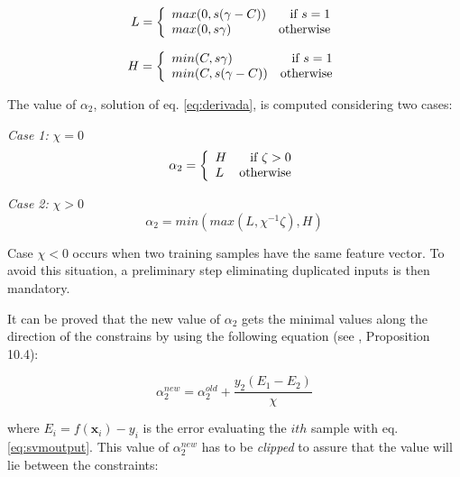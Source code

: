 \documentclass{ipol}
\def\x{{\mathbf x}}
\begin{document}
\begin{equation}
L = \left\{ \begin{array}{l r}
max(0,s(\gamma - C)) & \textrm{if }s = 1 \\
max(0,s\gamma) & \textrm{otherwise}
\end{array}
\right.
\end{equation}

\begin{equation}
H = \left\{ \begin{array}{l r}
min(C,s\gamma) & \textrm{if }s = 1 \\
min(C,s(\gamma-C)) & \textrm{otherwise}
\end{array}
\right.
\end{equation}

The value of $\alpha_2$, solution of eq. \ref{eq:derivada}, is computed considering two cases:

\noindent \textit{Case 1: }$\chi = 0$\\

\begin{equation}
\alpha_2 = \left\{ \begin{array}{l r}
H & \textrm{if }\zeta > 0 \\
L & \textrm{otherwise}
\end{array}
\right.
\end{equation}

\noindent \textit{Case 2: }$\chi > 0$\\

\begin{equation}
\alpha_2 = min(max(L,\chi^{-1} \zeta),H)
\end{equation}

\noindent Case $\chi < 0$ occurs when two training samples have the same feature vector.
To avoid this situation, a preliminary step eliminating duplicated inputs is then mandatory.

It can be proved that the new value of $\alpha_2$ gets the minimal values along the direction of the constrains by using the following equation (see \cite{Scholkopf:2002}, Proposition 10.4):

\begin{equation}\label{eq:itrativealpha2}
\alpha_2^{new}=\alpha_2^{old} + \frac{y_2 (E_1-E_2)}{\chi}
\end{equation}

\noindent where $E_i=f(\x_i)-y_i$ is the error evaluating the $ith$ sample with eq. \ref{eq:svmoutput}.
This value of $\alpha_2^{new}$ has to be \textit{clipped} to assure that the value will lie between the constraints:
\end{document}
